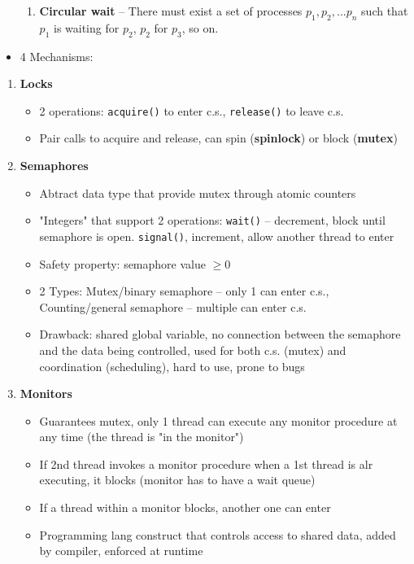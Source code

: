 \documentclass[10pt,landscape,a4paper]{article}
\begin{document}
\begin{multicols*}{4}
\begin{itemize}
\begin{enumerate}
            \item \textbf{Circular wait} -- There must exist a set of processes $p_1, p_2, ... p_n$ such that $p_1$ is waiting for $p_2$, $p_2$ for $p_3$, so on.
          \end{enumerate}
    \item 4 Mechanisms:
  \end{itemize}
  \begin{enumerate}
    \item \textbf{Locks}
          \begin{itemize}
            \item 2 operations: \texttt{acquire()} to enter c.s., \texttt{release()} to leave c.s.
            \item Pair calls to acquire and release, can spin (\textbf{spinlock}) or block (\textbf{mutex})
          \end{itemize}
    \item \textbf{Semaphores}
          \begin{itemize}
            \item Abtract data type that provide mutex through atomic counters
            \item "Integers" that support 2 operations: \texttt{wait()} -- decrement, block until semaphore is open. \texttt{signal()}, increment, allow another thread to enter
            \item Safety property: semaphore value $\geq 0$
            \item 2 Types: Mutex/binary semaphore -- only 1 can enter c.s., Counting/general semaphore -- multiple can enter c.s.
            \item Drawback: shared global variable, no connection between the semaphore and the data being controlled, used for both c.s. (mutex) and coordination (scheduling), hard to use, prone to bugs
          \end{itemize}
    \item \textbf{Monitors}
          \begin{itemize}
            \item Guarantees mutex, only 1 thread can execute any monitor procedure at any time (the thread is "in the monitor")
            \item If 2nd thread invokes a monitor procedure when a 1st thread is alr executing, it blocks (monitor has to have a wait queue)
            \item If a thread within a monitor blocks, another one can enter
            \item Programming lang construct that controls access to shared data, added by compiler, enforced at runtime

\end{itemize}
\end{enumerate}
\end{multicols*}
\end{document}
